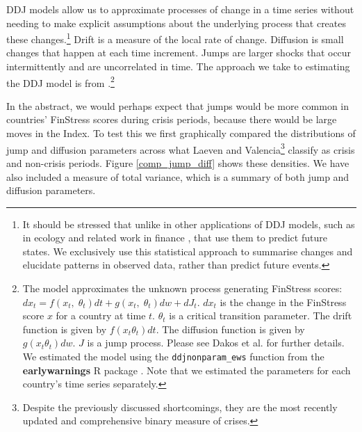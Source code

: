 \documentclass[]{article}
\begin{document}
DDJ models allow us to approximate processes of change in a time series without needing to make explicit assumptions about the underlying process that creates these changes.\footnote{It should be stressed that unlike in other applications of DDJ models, such as in ecology and related work in finance \citep{Kou2008}, that use them to predict future states. We exclusively use this statistical approach to summarise changes and elucidate patterns in observed data, rather than predict future events.} Drift is a measure of the local rate of change. Diffusion is small changes that happen at each time increment. Jumps are larger shocks that occur intermittently and are uncorrelated in time. The approach we take to estimating the DDJ model is from \cite{Carpenter2011}.\footnote{The model approximates the unknown process generating FinStress scores: $dx_{t} = f(x_{t},\;\theta_{t})dt + g(x_{t},\;\theta_{t})dw + dJ_{t}$. $dx_{t}$ is the change in the FinStress score $x$ for a country at time $t$. $\theta_{t}$ is a critical transition parameter. The drift function is given by $f(x_{t}\theta_{t})dt$. The diffusion function is given by $g(x_{t}\theta_{t})dw$. $J$ is a jump process. Please see Dakos et al. \citeyearpar[7]{Dakos2012} for further details. We estimated the model using the \texttt{ddjnonparam\_ews} function from the \textbf{earlywarnings} R package \citep{earlywarnings2013}. Note that we estimated the parameters for each country's time series separately.}

In the abstract, we would perhaps expect that jumps would be more common in countries' FinStress scores during crisis periods, because there would be large moves in the Index. To test this we first graphically compared the distributions of jump and diffusion parameters across what Laeven and Valencia\footnote{Despite the previously discussed shortcomings, they are the most recently updated and comprehensive binary measure of crises.} classify as crisis and non-crisis periods. Figure \ref{comp_jump_diff} shows these densities. We have also included a measure of total variance, which is a summary of both jump and diffusion parameters.
\end{document}
